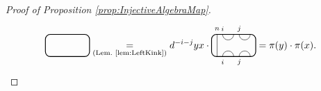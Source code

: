 \documentclass[11pt]{article}
\theoremstyle{plain}
\theoremstyle{definition}
\newcommand{\TLTCalcLabelOffset}[3][0cm]{
 \settowidth{#2}{\scriptsize{$#3$}}
 \setlength{#2}{.5#2}
 \setlength{#2}{\maxof{#2}{#1}}
}
\newcommand{\TLTEnd}{
 \draw[thick, rounded corners = 5pt] (0,0) rectangle ($ (TLTlead) + (0,.8) $);
 \end{tikzpicture}
}
\newcommand{\TLTStart}{
 \begin{tikzpicture}[baseline=.3cm]
 \coordinate (TLTlead) at (.2,0); %
 \let\TLTlabelwidth\relax
 \newlength{\TLTlabelwidth}
}
\newcommand{\TLTThrough}[1]{
 \TLTCalcLabelOffset[.2cm]{\TLTlabelwidth}{#1}
 \coordinate (TLTlead) at ($ (TLTlead) + ({\TLTlabelwidth},0) $);
 \begin{scope}[shift=(TLTlead)]
  \draw (0,0) -- (0,.8);
  \node at (0,1) {\scriptsize{$#1$}};
 \end{scope}
  \coordinate (TLTlead) at ($ (TLTlead) + ({\TLTlabelwidth},0) $);
}
\newcommand{\TLTCapcup}[1]{
 \TLTCalcLabelOffset[.2cm]{\TLTlabelwidth}{#1}
  \coordinate (TLTlead) at ($ (TLTlead) + ({\TLTlabelwidth},0) $);
 \begin{scope}[shift=(TLTlead)]
  \draw (0,0) arc (180:0:.2);
  \draw (0,.8) arc (-180:0:.2);
  \node at (0,1) {\scriptsize{$#1$}};
 \end{scope}
 \TLTCalcLabelOffset[.5cm]{\TLTlabelwidth}{#1}
 \coordinate (TLTlead) at ($ (TLTlead) + ({\TLTlabelwidth},0)$);
}
\begin{document}
\begin{proof}[Proof of Proposition \ref{prop:InjectiveAlgebraMap}]
$$\begin{tikzpicture}[baseline=.3cm]
  \draw[thick, rounded corners = 5pt] (0,0) rectangle (1.6,.8);
 \end{tikzpicture}
\underset{\text{(Lem.~\ref{lem:LeftKink})}}{=} 
d^{-i-j} yx \cdot 
 \begin{tikzpicture}[baseline=.3cm]
  \draw (.2,0) -- (.2,.8);
  \node at (.2,1) {\scriptsize{$n$}};
  \draw (.4,0) arc (180:0:.2cm);
  \node at (.4,-.2) {\scriptsize{$i$}};
  \draw (.4,.8) arc (-180:0:.2cm);
  \node at (.4,1) {\scriptsize{$i$}};
  \draw (1,0) arc (180:0:.2cm);
  \node at (1,-.2) {\scriptsize{$j$}};
  \draw (1,.8) arc (-180:0:.2cm);
  \node at (1,1) {\scriptsize{$j$}};
  \draw[thick, rounded corners = 5pt] (0,0) rectangle (1.6,.8);
 \end{tikzpicture}
 = \pi(y) \cdot \pi(x).
$$


\end{proof}
\end{document}

